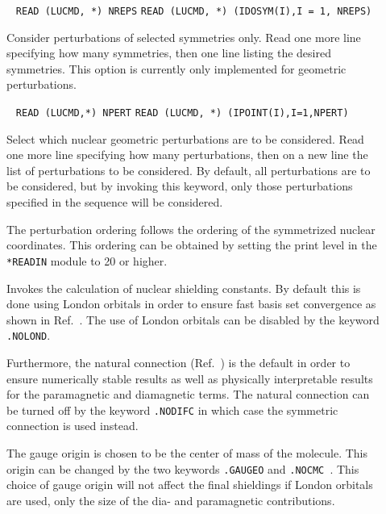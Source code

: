 \begin{description}
\item[] \verb| |\newline
\verb|READ (LUCMD, *) NREPS|\newline
\verb|READ (LUCMD, *) (IDOSYM(I),I = 1, NREPS)|

Consider perturbations of selected symmetries only.  Read one more
line specifying how many symmetries, then one line listing the
desired symmetries. This option is currently only implemented
for geometric perturbations. 


\item[]\verb| |
\newline
\verb|READ (LUCMD,*) NPERT|\newline
\verb|READ (LUCMD, *) (IPOINT(I),I=1,NPERT)|

Select which nuclear geometric perturbations are to be considered.
Read one more line specifying how many perturbations, then on a
new line the list of perturbations to be considered. By default,
all perturbations are to be considered, but by invoking this keyword,
only those perturbations specified in the sequence will be considered. 

The perturbation ordering follows the ordering of the symmetrized
nuclear coordinates. This ordering can be obtained by setting the
print level in the \verb|*READIN| module to 20 or higher.

\item[] Invokes the calculation of nuclear
shielding constants. By default this is done
using London orbitals in order to 
ensure fast basis set convergence as shown in
Ref.~\cite{kwjfhppjacs112,krthrkpjklbhjajjcp100}. The use of London
orbitals can be disabled by the keyword \verb|.NOLOND|.

Furthermore, the natural connection
(Ref.~\cite{joklbkrthpjtca90,krthjopjklbcpl235}) is the default in order to ensure
numerically stable results as well as physically interpretable
results for the paramagnetic and diamagnetic terms. The natural
connection can be turned off by the keyword \verb|.NODIFC| in which
case the symmetric connection is used instead.


The gauge origin is chosen to be the center of
mass of the molecule.
This origin can be changed by the two keywords \verb|.GAUGEO| and
\verb|.NOCMC |. This choice of gauge origin will not affect
the final shieldings if London orbitals are used, only the size of the
dia- and paramagnetic contributions.


\end{description}
